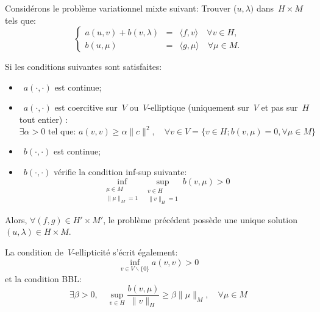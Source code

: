 \begin{theoreme}
Considérons le problème variationnel mixte suivant:
Trouver ($u, \lambda)$ dans~$H\times M$ tels que:
 \begin{equation}\label{Eq-PM}\left\{
\begin{array}{rcl}
 a(u,v) + b(v, \lambda) &=& \langle f,v\rangle \quad \forall v\in H,\\
b(u,\mu) &=& \langle g,\mu\rangle \quad \forall \mu \in M.
\end{array}\right.
\end{equation}

Si les conditions suivantes sont satisfaites:
\begin{itemize}
  \item~$a(\cdot,\cdot)$ est continue;
  \item~$a(\cdot,\cdot)$ est coercitive sur~$V$ ou~$V$-elliptique (uniquement sur~$V$ et pas sur~$H$ tout entier) :
  \begin{equation}\exists \alpha> 0 \text{ tel que: } a(v,v)\ge\alpha\|c\|^2, \quad \forall v\in V=\{v\in H; b(v,\mu)=0, \forall \mu\in M \}\end{equation}
  \item~$b(\cdot,\cdot)$ est continue;
  \item~$b(\cdot,\cdot)$ vérifie la condition inf-sup suivante:
\begin{equation}\inf_{\substack{\mu\in M\\\|\mu\|_M=1}} \sup_{\substack{v\in H\\\|v\|_H=1}} b(v,\mu) > 0\end{equation}
\end{itemize}
Alors, $\forall (f,g)\in H'\times M'$, le problème précédent possède une unique solution
$(u,\lambda) \in H\times M$.
\end{theoreme}

\medskip
{}


La condition de~$V$-ellipticité s'écrit également:
\begin{equation}\inf_{v\in V\backslash\{0\}} a(v,v)>0 \end{equation}
et la condition BBL:
\begin{equation}
\exists \beta > 0,\quad \sup_{v\in H} \dfrac{b(v,\mu)}{\|v\|_H}\ge \beta \|\mu\|_M,\quad \forall \mu\in M
\end{equation}


